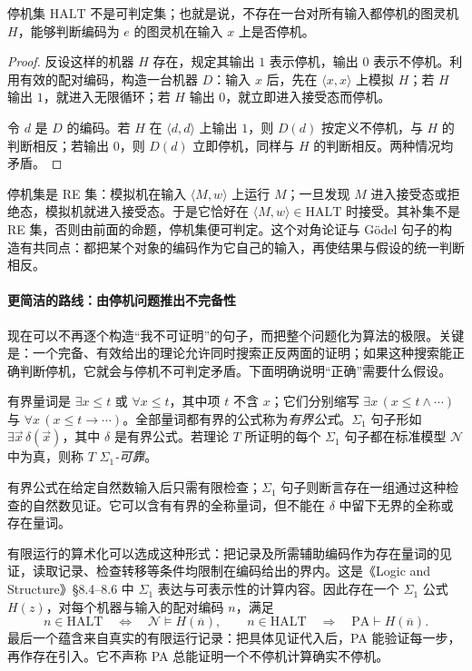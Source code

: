 \documentclass[lang=cn,a4paper,fontset=none,zihao=false,10pt,openany,twoside]{beautybook}
\numberwithin{algorithm}{chapter}
\begin{document}
\begin{theorem}[停机问题不可判定]
停机集 $\mathrm{HALT}$ 不是可判定集；也就是说，不存在一台对所有输入都停机的图灵机 $H$，能够判断编码为 $e$ 的图灵机在输入 $x$ 上是否停机。
\end{theorem}
\begin{proof}
反设这样的机器 $H$ 存在，规定其输出 $1$ 表示停机，输出 $0$ 表示不停机。利用有效的配对编码，构造一台机器 $D$：输入 $x$ 后，先在 $\langle x,x\rangle$ 上模拟 $H$；若 $H$ 输出 $1$，就进入无限循环；若 $H$ 输出 $0$，就立即进入接受态而停机。

令 $d$ 是 $D$ 的编码。若 $H$ 在 $\langle d,d\rangle$ 上输出 $1$，则 $D(d)$ 按定义不停机，与 $H$ 的判断相反；若输出 $0$，则 $D(d)$ 立即停机，同样与 $H$ 的判断相反。两种情况均矛盾。
\end{proof}
停机集是 RE 集：模拟机在输入 $\langle M,w\rangle$ 上运行 $M$；一旦发现 $M$ 进入接受态或拒绝态，模拟机就进入接受态。于是它恰好在 $\langle M,w\rangle\in\mathrm{HALT}$ 时接受。其补集不是 RE 集，否则由前面的命题，停机集便可判定。这个对角论证与 Gödel 句子的构造有共同点：都把某个对象的编码作为它自己的输入，再使结果与假设的统一判断相反。

\paragraph{更简洁的路线：由停机问题推出不完备性}
现在可以不再逐个构造“我不可证明”的句子，而把整个问题化为算法的极限。关键是：一个完备、有效给出的理论允许同时搜索正反两面的证明；如果这种搜索能正确判断停机，它就会与停机不可判定矛盾。下面明确说明“正确”需要什么假设。

\begin{definition}
有界量词是 $\exists x\leq t$ 或 $\forall x\leq t$，其中项 $t$ 不含 $x$；它们分别缩写 $\exists x\,(x\leq t\wedge\cdots)$ 与 $\forall x\,(x\leq t\to\cdots)$。全部量词都有界的公式称为\emph{有界公式}。$\Sigma_1$ 句子形如 $\exists\vec x\,\delta(\vec x)$，其中 $\delta$ 是有界公式。若理论 $T$ 所证明的每个 $\Sigma_1$ 句子都在标准模型 $\mathcal N$ 中为真，则称 $T$ \emph{$\Sigma_1$-可靠}。
\end{definition}
有界公式在给定自然数输入后只需有限检查；$\Sigma_1$ 句子则断言存在一组通过这种检查的自然数见证。它可以含有有界的全称量词，但不能在 $\delta$ 中留下无界的全称或存在量词。

有限运行的算术化可以选成这种形式：把记录及所需辅助编码作为存在量词的见证，读取记录、检查转移等条件均限制在编码给出的界内。这是《Logic and Structure》§8.4--8.6 中 $\Sigma_1$ 表达与可表示性的计算内容。因此存在一个 $\Sigma_1$ 公式 $H(z)$，对每个机器与输入的配对编码 $n$，满足
\[
 n\in\mathrm{HALT}\quad\Longleftrightarrow\quad
 \mathcal N\models H(\overline n),
 \qquad
 n\in\mathrm{HALT}\quad\Longrightarrow\quad
 \mathrm{PA}\vdash H(\overline n).
\]
最后一个蕴含来自真实的有限运行记录：把具体见证代入后，PA 能验证每一步，再作存在引入。它不声称 PA 总能证明一个不停机计算确实不停机。
\end{document}
